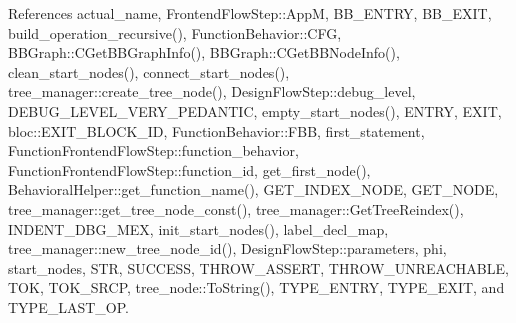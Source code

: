 References actual\+\_\+name, Frontend\+Flow\+Step\+::\+AppM, B\+B\+\_\+\+E\+N\+T\+RY, B\+B\+\_\+\+E\+X\+IT, build\+\_\+operation\+\_\+recursive(), Function\+Behavior\+::\+C\+FG, B\+B\+Graph\+::\+C\+Get\+B\+B\+Graph\+Info(), B\+B\+Graph\+::\+C\+Get\+B\+B\+Node\+Info(), clean\+\_\+start\+\_\+nodes(), connect\+\_\+start\+\_\+nodes(), tree\+\_\+manager\+::create\+\_\+tree\+\_\+node(), Design\+Flow\+Step\+::debug\+\_\+level, D\+E\+B\+U\+G\+\_\+\+L\+E\+V\+E\+L\+\_\+\+V\+E\+R\+Y\+\_\+\+P\+E\+D\+A\+N\+T\+IC, empty\+\_\+start\+\_\+nodes(), E\+N\+T\+RY, E\+X\+IT, bloc\+::\+E\+X\+I\+T\+\_\+\+B\+L\+O\+C\+K\+\_\+\+ID, Function\+Behavior\+::\+F\+BB, first\+\_\+statement, Function\+Frontend\+Flow\+Step\+::function\+\_\+behavior, Function\+Frontend\+Flow\+Step\+::function\+\_\+id, get\+\_\+first\+\_\+node(), Behavioral\+Helper\+::get\+\_\+function\+\_\+name(), G\+E\+T\+\_\+\+I\+N\+D\+E\+X\+\_\+\+N\+O\+DE, G\+E\+T\+\_\+\+N\+O\+DE, tree\+\_\+manager\+::get\+\_\+tree\+\_\+node\+\_\+const(), tree\+\_\+manager\+::\+Get\+Tree\+Reindex(), I\+N\+D\+E\+N\+T\+\_\+\+D\+B\+G\+\_\+\+M\+EX, init\+\_\+start\+\_\+nodes(), label\+\_\+decl\+\_\+map, tree\+\_\+manager\+::new\+\_\+tree\+\_\+node\+\_\+id(), Design\+Flow\+Step\+::parameters, phi, start\+\_\+nodes, S\+TR, S\+U\+C\+C\+E\+SS, T\+H\+R\+O\+W\+\_\+\+A\+S\+S\+E\+RT, T\+H\+R\+O\+W\+\_\+\+U\+N\+R\+E\+A\+C\+H\+A\+B\+LE, T\+OK, T\+O\+K\+\_\+\+S\+R\+CP, tree\+\_\+node\+::\+To\+String(), T\+Y\+P\+E\+\_\+\+E\+N\+T\+RY, T\+Y\+P\+E\+\_\+\+E\+X\+IT, and T\+Y\+P\+E\+\_\+\+L\+A\+S\+T\+\_\+\+OP.

